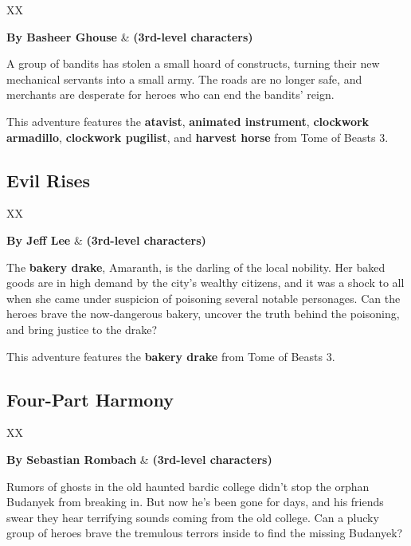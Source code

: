 \documentclass[10pt,a4paper,twoside,bg=print,twocolumn,openany,nodeprecatedcode]{dndbook}
\begin{document}
\begin{DndTable}{XX}

\textbf{By Basheer Ghouse} & \textbf{(3rd-level characters)}\\
\end{DndTable}

A group of bandits has stolen a small hoard of constructs, turning their new mechanical servants into a small army. The roads are no longer safe, and merchants are desperate for heroes who can end the bandits' reign.

This adventure features the \textbf{atavist}, \textbf{animated instrument}, \textbf{clockwork armadillo}, \textbf{clockwork pugilist}, and \textbf{harvest horse} from Tome of Beasts 3.

\subsection{Evil Rises}

\begin{DndTable}{XX}

\textbf{By Jeff Lee} & \textbf{(3rd-level characters)}\\
\end{DndTable}

The \textbf{bakery drake}, Amaranth, is the darling of the local nobility. Her baked goods are in high demand by the city's wealthy citizens, and it was a shock to all when she came under suspicion of poisoning several notable personages. Can the heroes brave the now-dangerous bakery, uncover the truth behind the poisoning, and bring justice to the drake?

This adventure features the \textbf{bakery drake} from Tome of Beasts 3.

\subsection{Four-Part Harmony}

\begin{DndTable}{XX}

\textbf{By Sebastian Rombach} & \textbf{(3rd-level characters)}\\
\end{DndTable}

Rumors of ghosts in the old haunted bardic college didn't stop the orphan Budanyek from breaking in. But now he's been gone for days, and his friends swear they hear terrifying sounds coming from the old college. Can a plucky group of heroes brave the tremulous terrors inside to find the missing Budanyek?
\end{document}

